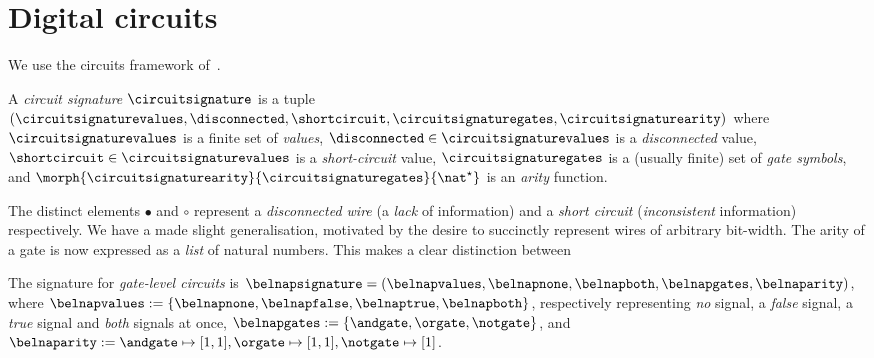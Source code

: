 
\section{Digital circuits}

We use the circuits framework of~\cite{ghica2022compositional}.

\begin{definition}
    A \emph{circuit signature} \(\circuitsignature\) is a tuple \((
        \circuitsignaturevalues,
        \disconnected,
        \shortcircuit,
        \circuitsignaturegates,
        \circuitsignaturearity
    )\) where \(\circuitsignaturevalues\) is a finite set of \emph{values}, \(
        \disconnected \in \circuitsignaturevalues
    \) is a \emph{disconnected} value, \(
        \shortcircuit \in \circuitsignaturevalues
    \) is a \emph{short-circuit} value, \(
        \circuitsignaturegates
    \) is a (usually finite) set of \emph{gate symbols}, and \(
        \morph{\circuitsignaturearity}{\circuitsignaturegates}{\nat^\star}
    \) is an \emph{arity} function.
\end{definition}

The distinct elements \(\bullet\) and \(\circ\) represent a
\emph{disconnected wire} (a \emph{lack} of information) and a
\emph{short circuit} (\emph{inconsistent} information) respectively.
We have a made slight generalisation, motivated by the desire to succinctly
represent wires of arbitrary bit-width.
The arity of a gate is now expressed as a \emph{list} of natural numbers.
This makes a clear distinction between

\begin{example}\label{ex:sig}
    The signature for \emph{gate-level circuits} is \(
        \belnapsignature = (
            \belnapvalues,
            \belnapnone,
            \belnapboth,
            \belnapgates,
            \belnaparity
    )\), where \(
        \belnapvalues := \{\belnapnone, \belnapfalse, \belnaptrue, \belnapboth\}
    \), respectively representing \emph{no} signal, a \emph{false} signal, a
        \emph{true} signal and \emph{both} signals at once, \(
        \belnapgates := \{\andgate,\orgate,\notgate\}
    \), and \(
        \belnaparity :=
            \andgate \mapsto [1, 1],
            \orgate \mapsto [1, 1],
            \notgate \mapsto [1]
    \).
\end{example}

